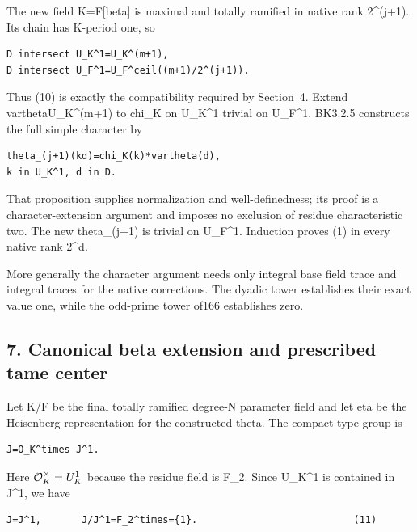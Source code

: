 The new field K=F{[}beta{]} is maximal and totally ramified in native
rank 2\^{}(j+1). Its chain has K-period one, so

\begin{Verbatim}[fontsize=\small,breaklines=true,breakanywhere=true]
D intersect U_K^1=U_K^(m+1),
D intersect U_F^1=U_F^ceil((m+1)/2^(j+1)).
\end{Verbatim}

Thus (10) is exactly the compatibility required by Section~4. Extend
vartheta\textbar U\_K\^{}(m+1) to chi\_K on U\_K\^{}1 trivial on
U\_F\^{}1. BK3.2.5 constructs the full simple character by

\begin{Verbatim}[fontsize=\small,breaklines=true,breakanywhere=true]
theta_(j+1)(kd)=chi_K(k)*vartheta(d),
k in U_K^1, d in D.
\end{Verbatim}

That proposition supplies normalization and well-definedness; its proof
is a character-extension argument and imposes no exclusion of residue
characteristic two. The new theta\_(j+1) is trivial on U\_F\^{}1.
Induction proves (1) in every native rank 2\^{}d.

More generally the character argument needs only integral base field
trace and integral traces for the native corrections. The dyadic tower
establishes their exact value one, while the odd-prime tower of166
establishes zero.

\hypertarget{dyadic_character-canonical-beta-extension-and-prescribed-tame-center}{%
\subsection{7. Canonical beta extension and prescribed tame
center}\label{dyadic_character-canonical-beta-extension-and-prescribed-tame-center}}

Let K/F be the final totally ramified degree-N parameter field and let
eta be the Heisenberg representation for the constructed theta. The
compact type group is

\begin{Verbatim}[fontsize=\small,breaklines=true,breakanywhere=true]
J=O_K^times J^1.
\end{Verbatim}

Here \(\mathcal O_K^\times=U_K^1\) because the residue field is
F\_2. Since U\_K\^{}1 is contained in J\^{}1, we have

\begin{Verbatim}[fontsize=\small,breaklines=true,breakanywhere=true]
J=J^1,       J/J^1=F_2^times={1}.                           (11)
\end{Verbatim}

